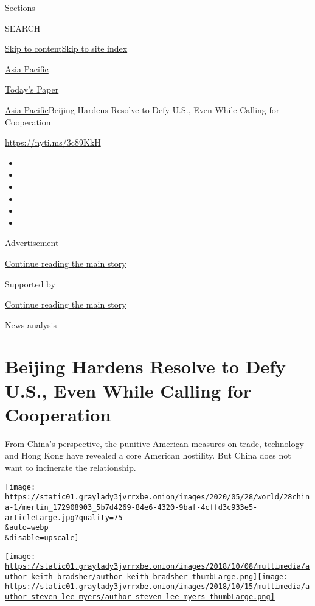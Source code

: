 Sections

SEARCH

\protect\hyperlink{site-content}{Skip to
content}\protect\hyperlink{site-index}{Skip to site index}

\href{https://www.nytimes3xbfgragh.onion/section/world/asia}{Asia
Pacific}

\href{https://myaccount.nytimes3xbfgragh.onion/auth/login?response_type=cookie\&client_id=vi}{}

\href{https://www.nytimes3xbfgragh.onion/section/todayspaper}{Today's
Paper}

\href{/section/world/asia}{Asia Pacific}\textbar{}Beijing Hardens
Resolve to Defy U.S., Even While Calling for Cooperation

\url{https://nyti.ms/3c89KkH}

\begin{itemize}
\item
\item
\item
\item
\item
\item
\end{itemize}

Advertisement

\protect\hyperlink{after-top}{Continue reading the main story}

Supported by

\protect\hyperlink{after-sponsor}{Continue reading the main story}

News analysis

\hypertarget{beijing-hardens-resolve-to-defy-us-even-while-calling-for-cooperation}{%
\section{Beijing Hardens Resolve to Defy U.S., Even While Calling for
Cooperation}\label{beijing-hardens-resolve-to-defy-us-even-while-calling-for-cooperation}}

From China's perspective, the punitive American measures on trade,
technology and Hong Kong have revealed a core American hostility. But
China does not want to incinerate the relationship.

\texttt{[image: https://static01.graylady3jvrrxbe.onion/images/2020/05/28/world/28china-1/merlin\_172908903\_5b7d4269-84e6-4320-9baf-4cffd3c933e5-articleLarge.jpg?quality=75\\\&auto=webp\\\&disable=upscale]}

\href{https://www.nytimes3xbfgragh.onion/by/keith-bradsher}{\texttt{[image: https://static01.graylady3jvrrxbe.onion/images/2018/10/08/multimedia/author-keith-bradsher/author-keith-bradsher-thumbLarge.png]}}\href{https://www.nytimes3xbfgragh.onion/by/steven-lee-myers}{\texttt{[image: https://static01.graylady3jvrrxbe.onion/images/2018/10/15/multimedia/author-steven-lee-myers/author-steven-lee-myers-thumbLarge.png]}}

